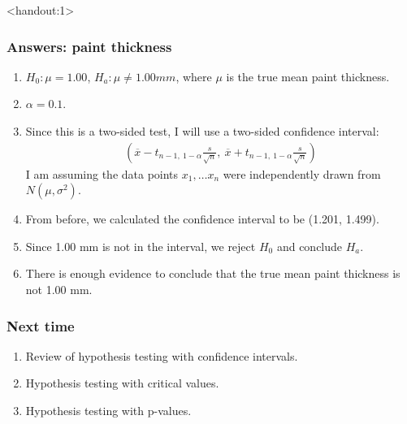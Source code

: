 \documentclass[handout]{beamer}\usepackage{graphicx, color}
\newcommand{\answers}{1}
\providecommand{\ov}[1]{\overline{#1}}
\numberwithin{equation}{section}
\begin{document}
\begin{frame}<handout:\answers>
\frametitle{Answers: paint thickness} \small
\begin{enumerate}[1. ]
\item $H_0: \mu = 1.00$, $H_a: \mu \ne 1.00 mm$, where $\mu$ is the true mean paint thickness. 
\pause \item $\alpha = 0.1$.
\pause \item Since this is a two-sided test, I will use a two-sided confidence interval:
\pause \begin{align*}
\left (\ov{x} - t_{n - 1 , \ 1 - \alpha} \frac{s}{\sqrt{n}}, \ \ov{x} + t_{n - 1 , \ 1 - \alpha} \frac{s}{\sqrt{n}} \right)
\end{align*}
I am assuming the data points $x_1, \ldots x_n$ were independently drawn from $N(\mu, \sigma^2)$.
\pause \item From before, we calculated the confidence interval to be (1.201, 1.499).
\pause \item Since 1.00 mm is not in the interval, we reject $H_0$ and conclude $H_a$.
\pause \item There is enough evidence to conclude that the true mean paint thickness is not 1.00 mm.
\end{enumerate}
\end{frame}

\begin{frame}
\frametitle{Next time}
\begin{enumerate}[1. ]
\item Review of hypothesis testing with confidence intervals.
\pause \item Hypothesis testing with critical values. 
\pause \item Hypothesis testing with p-values.
\end{enumerate}
\end{frame}
\end{document}
